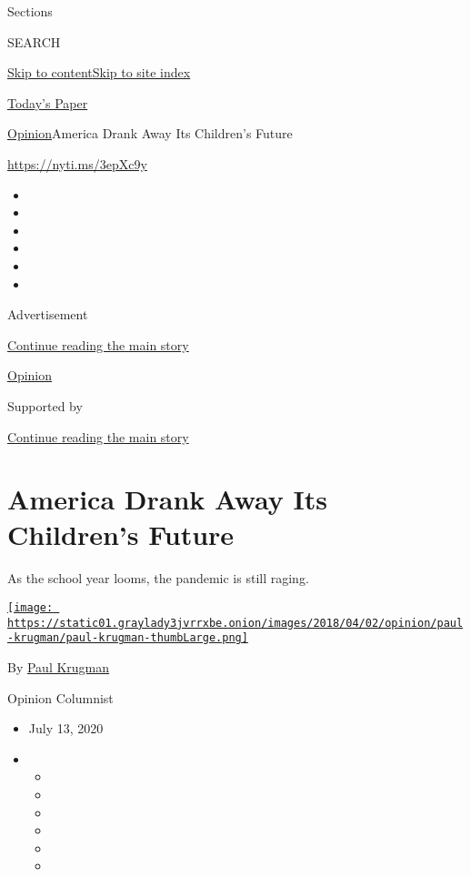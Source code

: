 Sections

SEARCH

\protect\hyperlink{site-content}{Skip to
content}\protect\hyperlink{site-index}{Skip to site index}

\href{https://myaccount.nytimes3xbfgragh.onion/auth/login?response_type=cookie\&client_id=vi}{}

\href{https://www.nytimes3xbfgragh.onion/section/todayspaper}{Today's
Paper}

\href{/section/opinion}{Opinion}\textbar{}America Drank Away Its
Children's Future

\href{https://nyti.ms/3epXc9y}{https://nyti.ms/3epXc9y}

\begin{itemize}
\item
\item
\item
\item
\item
\item
\end{itemize}

Advertisement

\protect\hyperlink{after-top}{Continue reading the main story}

\href{/section/opinion}{Opinion}

Supported by

\protect\hyperlink{after-sponsor}{Continue reading the main story}

\hypertarget{america-drank-away-its-childrens-future}{%
\section{America Drank Away Its Children's
Future}\label{america-drank-away-its-childrens-future}}

As the school year looms, the pandemic is still raging.

\href{https://www.nytimes3xbfgragh.onion/by/paul-krugman}{\texttt{[image: https://static01.graylady3jvrrxbe.onion/images/2018/04/02/opinion/paul-krugman/paul-krugman-thumbLarge.png]}}

By \href{https://www.nytimes3xbfgragh.onion/by/paul-krugman}{Paul
Krugman}

Opinion Columnist

\begin{itemize}
\item
  July 13, 2020
\item
  \begin{itemize}
  \item
  \item
  \item
  \item
  \item
  \item
  \end{itemize}
\end{itemize}

